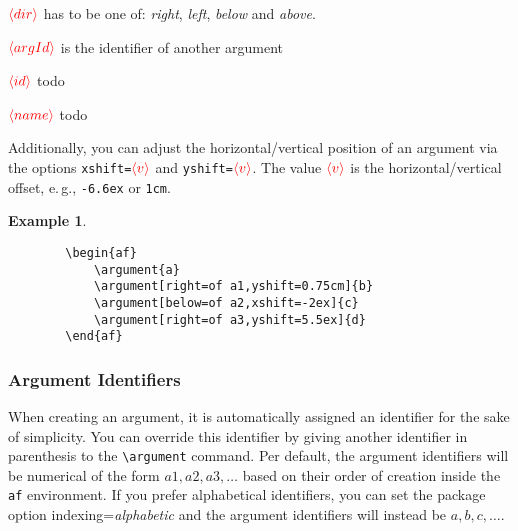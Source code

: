 \documentclass[headings=normal]{scrartcl}
\newcommand{\opt}[2][red]{\ensuremath{\textcolor{#1}{\langle #2\rangle}}}
\newtheorem{example}{Example}
\newcommand{\makecmd}[1]{\textbackslash\hspace{-1ex}#1}
\newenvironment{command}[1]{
    \medskip\medskip
    \hspace{-1.5cm}{\ttfamily \makecmd{#1}}
    \begin{description}[labelindent=1.5cm,labelsep=0.5em, align=right]
}{%
    \end{description}
    \medskip
}
\begin{document}
    \begin{command}{
        argument[\opt{dir}=of \opt{argId}](\opt{id})\{\opt{name}\}
    }
        \item[\opt{dir}] has to be one of: \emph{right}, \emph{left}, \emph{below} and \emph{above}.
        \item[\opt{argId}] is the identifier of another argument
        \item[\opt{id}] todo
        \item[\opt{name}] todo
    \end{command}

    Additionally, you can adjust the horizontal/vertical position of an argument via the options \verb|xshift=|\opt{v} and \verb|yshift=|\opt{v}.
        The value \opt{v} is the horizontal/vertical offset, e.\,g., \verb|-6.6ex| or \verb|1cm|.

    \begin{example}~

    \begin{minipage}{0.25\textwidth}
        \begin{center}
        \begin{af}
        \end{af}
        \end{center}
    \end{minipage}%
    \begin{minipage}{0.5\textwidth}
        \begin{verbatim}
        \begin{af}
            \argument{a}
            \argument[right=of a1,yshift=0.75cm]{b}
            \argument[below=of a2,xshift=-2ex]{c}
            \argument[right=of a3,yshift=5.5ex]{d}
        \end{af}
        \end{verbatim}
    \end{minipage}%
    \end{example}


\subsubsection{Argument Identifiers}
    When creating an argument, it is automatically assigned an identifier for the sake of simplicity.
    You can override this identifier by giving another identifier in parenthesis to the \verb|\argument| command.
    Per default, the argument identifiers will be numerical of the form $a1, a2, a3, \dots$ based on their order of creation inside the \texttt{af} environment.
    If you prefer alphabetical identifiers, you can set the package option \textsf{indexing}=\emph{alphabetic} and the argument identifiers will instead be $a, b, c, \dots$.
\end{document}
